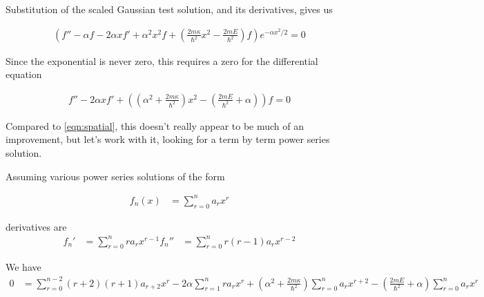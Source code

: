 \documentclass{article}
\begin{document}
Substitution of the scaled Gaussian test solution, and its derivatives, gives us

\begin{align*}
\left( f'' - \alpha f - 2 \alpha x f' + \alpha^2 x^2 f + \left( \frac{2 m \kappa}{\hbar^2} x^2 - \frac{2 m E}{\hbar^2} \right) f \right) e^{ -\alpha x^2 /2} = 0
\end{align*}

Since the exponential is never zero, this requires a zero for the differential equation

\begin{align}
f'' - 2 \alpha x f' + \left( \left(\alpha^2 + \frac{2 m \kappa}{\hbar^2} \right) x^2 - \left(\frac{2 m E}{\hbar^2} + \alpha \right) \right) f = 0
\end{align}

Compared to \ref{eqn:spatial}, this doesn't really appear to be much of an improvement, but let's work with it, looking for a term by term power series solution.

Assuming various power series solutions of the form

\begin{align*}
f_n(x) &= \sum_{r=0}^n a_r x^r
\end{align*}

derivatives are
\begin{align*}
f_n' &= \sum_{r=0}^n r a_r x^{r-1}
f_n'' &= \sum_{r=0}^n r(r-1) a_r x^{r-2}
\end{align*}

We have 
\begin{align*}
0 &= \sum_{r=0}^{n-2} (r+2)(r+1) a_{r+2} x^{r}
 - 2 \alpha \sum_{r=1}^n r a_r x^{r}
+ \left(\alpha^2 + \frac{2 m \kappa}{\hbar^2} \right) \sum_{r=0}^n a_r x^{r+2}
- \left(\frac{2 m E}{\hbar^2} + \alpha \right) \sum_{r=0}^n a_r x^r
\end{align*}



\end{document}
